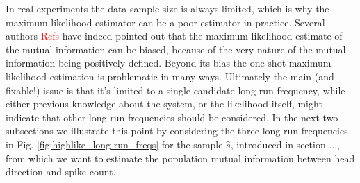 In real experiments the data sample size is always limited, which is why the maximum-likelihood estimator can be a poor estimator in practice. Several authors \textcolor{red}{Refs} have indeed pointed out that the maximum-likelihood estimate of the mutual information can be biased, because of the very nature of the mutual information being positively defined. Beyond its bias the one-shot maximum-likelihood estimation is problematic in many ways. 
Ultimately the main (and fixable!) issue is that it's limited to a single candidate long-run frequency, while either previous knowledge about the system, or the likelihood itself, might indicate that other long-run frequencies should be considered. In the next two subsections we illustrate this point by considering the three long-run frequencies in Fig. \ref{fig:highlike_long-run_freqs} for the sample $\hat{s}$, introduced in section ..., from which we want to estimate the population mutual information between head direction and spike count.



